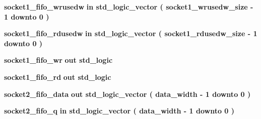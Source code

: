 \begin{DoxyCompactItemize}
\item 
{\bf socket1\+\_\+fifo\+\_\+wrusedw}  {\bfseries {\bfseries \textcolor{keywordflow}{in}\textcolor{vhdlchar}{ }}} {\bfseries \textcolor{comment}{std\+\_\+logic\+\_\+vector}\textcolor{vhdlchar}{ }\textcolor{vhdlchar}{(}\textcolor{vhdlchar}{ }\textcolor{vhdlchar}{ }\textcolor{vhdlchar}{ }\textcolor{vhdlchar}{ }{\bfseries {\bf socket1\+\_\+wrusedw\+\_\+size}} \textcolor{vhdlchar}{-\/}\textcolor{vhdlchar}{ } \textcolor{vhdldigit}{1} \textcolor{vhdlchar}{ }\textcolor{keywordflow}{downto}\textcolor{vhdlchar}{ }\textcolor{vhdlchar}{ } \textcolor{vhdldigit}{0} \textcolor{vhdlchar}{ }\textcolor{vhdlchar}{)}\textcolor{vhdlchar}{ }} 
\item 
{\bf socket1\+\_\+fifo\+\_\+rdusedw}  {\bfseries {\bfseries \textcolor{keywordflow}{in}\textcolor{vhdlchar}{ }}} {\bfseries \textcolor{comment}{std\+\_\+logic\+\_\+vector}\textcolor{vhdlchar}{ }\textcolor{vhdlchar}{(}\textcolor{vhdlchar}{ }\textcolor{vhdlchar}{ }\textcolor{vhdlchar}{ }\textcolor{vhdlchar}{ }{\bfseries {\bf socket1\+\_\+rdusedw\+\_\+size}} \textcolor{vhdlchar}{-\/}\textcolor{vhdlchar}{ } \textcolor{vhdldigit}{1} \textcolor{vhdlchar}{ }\textcolor{keywordflow}{downto}\textcolor{vhdlchar}{ }\textcolor{vhdlchar}{ } \textcolor{vhdldigit}{0} \textcolor{vhdlchar}{ }\textcolor{vhdlchar}{)}\textcolor{vhdlchar}{ }} 
\item 
{\bf socket1\+\_\+fifo\+\_\+wr}  {\bfseries {\bfseries \textcolor{keywordflow}{out}\textcolor{vhdlchar}{ }}} {\bfseries \textcolor{comment}{std\+\_\+logic}\textcolor{vhdlchar}{ }} 
\item 
{\bf socket1\+\_\+fifo\+\_\+rd}  {\bfseries {\bfseries \textcolor{keywordflow}{out}\textcolor{vhdlchar}{ }}} {\bfseries \textcolor{comment}{std\+\_\+logic}\textcolor{vhdlchar}{ }} 
\item 
{\bf socket2\+\_\+fifo\+\_\+data}  {\bfseries {\bfseries \textcolor{keywordflow}{out}\textcolor{vhdlchar}{ }}} {\bfseries \textcolor{comment}{std\+\_\+logic\+\_\+vector}\textcolor{vhdlchar}{ }\textcolor{vhdlchar}{(}\textcolor{vhdlchar}{ }\textcolor{vhdlchar}{ }\textcolor{vhdlchar}{ }\textcolor{vhdlchar}{ }{\bfseries {\bf data\+\_\+width}} \textcolor{vhdlchar}{-\/}\textcolor{vhdlchar}{ } \textcolor{vhdldigit}{1} \textcolor{vhdlchar}{ }\textcolor{keywordflow}{downto}\textcolor{vhdlchar}{ }\textcolor{vhdlchar}{ } \textcolor{vhdldigit}{0} \textcolor{vhdlchar}{ }\textcolor{vhdlchar}{)}\textcolor{vhdlchar}{ }} 
\item 
{\bf socket2\+\_\+fifo\+\_\+q}  {\bfseries {\bfseries \textcolor{keywordflow}{in}\textcolor{vhdlchar}{ }}} {\bfseries \textcolor{comment}{std\+\_\+logic\+\_\+vector}\textcolor{vhdlchar}{ }\textcolor{vhdlchar}{(}\textcolor{vhdlchar}{ }\textcolor{vhdlchar}{ }\textcolor{vhdlchar}{ }\textcolor{vhdlchar}{ }{\bfseries {\bf data\+\_\+width}} \textcolor{vhdlchar}{-\/}\textcolor{vhdlchar}{ } \textcolor{vhdldigit}{1} \textcolor{vhdlchar}{ }\textcolor{keywordflow}{downto}\textcolor{vhdlchar}{ }\textcolor{vhdlchar}{ } \textcolor{vhdldigit}{0} \textcolor{vhdlchar}{ }\textcolor{vhdlchar}{)}\textcolor{vhdlchar}{ }} 

\end{DoxyCompactItemize}
